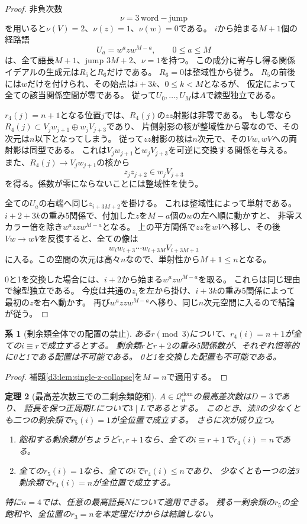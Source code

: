 \documentclass[11pt,a4paper]{ltjsarticle}
\newtheorem{theorem}{定理}[section]
\newtheorem{corollary}[theorem]{系}
\theoremstyle{definition}
\begin{document}
\begin{proof}
非負次数
\[
\nu=3\,\mathrm{word}-\mathrm{jump}
\]
を用いると$\nu(V)=2$、$\nu(z)=1$、$\nu(w)=0$である。
$i$から始まる$M+1$個の経路語
\[
U_a=w^a z w^{M-a},\qquad 0\le a\le M
\]
は、全て語長$M+1$、jump $3M+2$、$\nu=1$を持つ。
この成分に寄与し得る関係イデアルの生成元は$R_5$と$R_6$だけである。
$R_6=0$は整域性から従う。
$R_5$の前後には$w$だけを付けられ、その始点は$i+3k$、$0\le k<M$となるが、
仮定によって全ての該当関係空間が零である。
従って$U_0,\ldots,U_M$は$A$で線型独立である。

$r_4(j)=n+1$となる位置$j$では、$R_4(j)$の$zz$射影は非零である。
もし零なら$R_4(j)\subset V_jw_{j+1}\oplus w_jV_{j+3}$であり、
片側射影の核が整域性から零なので、その次元は$n$以下となってしまう。
従って$zz$射影の核は$n$次元で、その$Vw,wV$への両射影は同型である。
これは$V_jw_{j+1}$と$w_jV_{j+3}$を可逆に交換する関係を与える。
また、$R_4(j)\to V_jw_{j+1}$の核から
\[
z_jz_{j+2}\in w_jV_{j+3}
\]
を得る。係数が零にならないことには整域性を使う。

全ての$U_a$の右端へ同じ$z_{i+3M+2}$を掛ける。
これは整域性によって単射である。
$i+2+3k$の重み5関係で、付加した$z$を$M-a$個の$w$の左へ順に動かすと、
非零スカラー倍を除き$w^a zz w^{M-a}$となる。
上の平方関係で$zz$を$wV$へ移し、その後$Vw\to wV$を反復すると、全ての像は
\[
w_iw_{i+3}\cdots w_{i+3M}V_{i+3M+3}
\]
に入る。この空間の次元は高々$n$なので、単射性から$M+1\le n$となる。

0と1を交換した場合には、$i+2$から始まる$w^a z w^{M-a}$を取る。
これらは同じ理由で線型独立である。
今度は共通の$z_i$を左から掛け、$i+3k$の重み5関係によって最初の$z$を右へ動かす。
再び$w^a zz w^{M-a}$へ移り、同じ$n$次元空間に入るので結論が従う。
\end{proof}

\begin{corollary}[剰余類全体での配置の禁止]
\label{d3:cor:single-z-class}
ある$r\pmod3$について、$r_4(i)=n+1$が全ての$i\equiv r$で成立するとする。
剰余類$r$と$r+2$の重み5関係数が、それぞれ恒等的に0と1である配置は不可能である。
0と1を交換した配置も不可能である。
\end{corollary}
\begin{proof}
補題\ref{d3:lem:single-z-collapse}を$M=n$で適用する。
\end{proof}

\begin{theorem}[最高差次数三での二剰余類飽和]
\label{d3:thm:two-saturated-classes}
$A\in\mathcal Q_n^{\mathrm{dom}}$の最高差次数は$D=3$であり、
語長を保つ正周期$L$について$3\mid L$であるとする。
このとき、法3の少なくとも二つの剰余類で$r_5(i)=1$が全位置で成立する。
さらに次が成り立つ。
\begin{enumerate}
\item 飽和する剰余類がちょうど$r,r+1$なら、全ての$i\equiv r+1$で$r_4(i)=n$である。
\item 全ての$r_5(i)=1$なら、全ての$i$で$r_4(i)\le n$であり、
      少なくとも一つの法3剰余類で$r_4(i)=n$が全位置で成立する。
\end{enumerate}
特に$n=4$では、任意の最高語長$N$について適用できる。
残る一剰余類の$r_5$の全飽和や、全位置の$r_3=n$を本定理だけからは結論しない。
\end{theorem}
\end{document}
